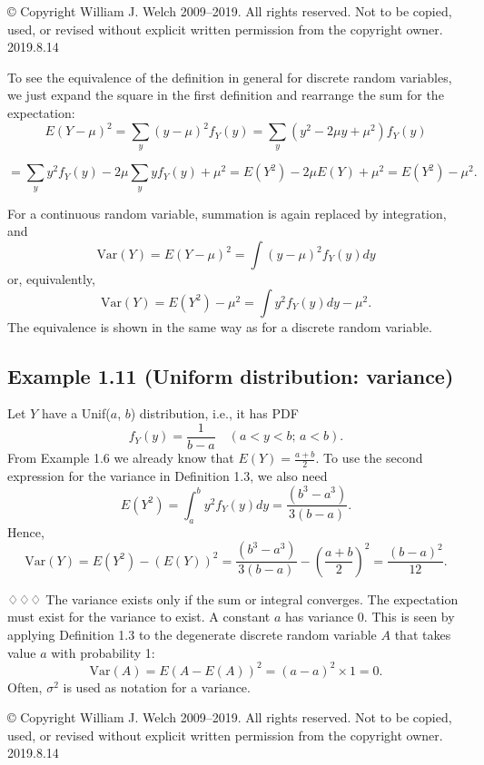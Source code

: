 © Copyright William J. Welch 2009--2019. All rights reserved. Not to be copied, used, or revised without explicit written permission from the copyright owner. 2019.8.14

To see the equivalence of the definition in general for discrete random variables, we just expand the square in the first definition and rearrange the sum for the expectation:
\[
E(Y - \mu)^2 = \sum_y (y - \mu)^2 f_Y(y) = \sum_y (y^2 - 2\mu y + \mu^2)f_Y(y)
\]

\[
= \sum_y y^2 f_Y(y) - 2\mu \sum_y y f_Y(y) + \mu^2 = E(Y^2) - 2\mu E(Y) + \mu^2 = E(Y^2) - \mu^2.
\]

For a continuous random variable, summation is again replaced by integration, and
\[
\text{Var}(Y) = E(Y - \mu)^2 = \int (y - \mu)^2 f_Y(y) dy
\]
or, equivalently,
\[
\text{Var}(Y) = E(Y^2) - \mu^2 = \int y^2 f_Y(y) dy - \mu^2.
\]
The equivalence is shown in the same way as for a discrete random variable. 

\subsection{Example 1.11 (Uniform distribution: variance)}
Let $Y$ have a Unif($a$, $b$) distribution, i.e., it has PDF
\[
f_Y(y) = \frac{1}{b-a} \quad (a < y < b; \, a < b).
\]
From Example 1.6 we already know that $E(Y) = \frac{a + b}{2}$. To use the second expression for the variance in Definition 1.3, we also need
\[
E(Y^2) =
\int_a^b y^2 f_Y(y) dy = \frac{(b^3 - a^3)}{3(b-a)}.
\]
Hence,
\[
\text{Var}(Y) = E(Y^2) - (E(Y))^2 = \frac{(b^3-a^3)}{3(b-a)} - \left(\frac{a+b}{2}\right)^2 = \frac{(b-a)^2}{12}.
\]

♢♢♢
The variance exists only if the sum or integral converges. The expectation must exist for the variance to exist. A constant $a$ has variance 0. This is seen by applying Definition 1.3 to the degenerate discrete random variable $A$ that takes value $a$ with probability 1:
\[
\text{Var}(A) = E(A - E(A))^2 = (a - a)^2 \times 1 = 0.
\]
Often, $\sigma^2$ is used as notation for a variance.

© Copyright William J. Welch 2009--2019. All rights reserved. Not to be copied, used, or revised without explicit written permission from the copyright owner. 2019.8.14

